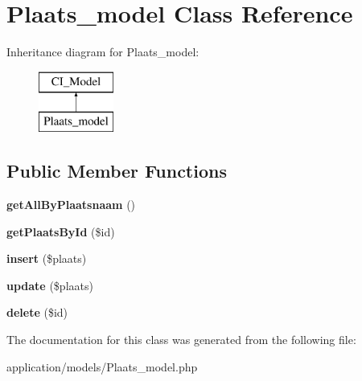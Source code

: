 \hypertarget{class_plaats__model}{}\section{Plaats\+\_\+model Class Reference}
\label{class_plaats__model}
Inheritance diagram for Plaats\+\_\+model\+:\begin{figure}[H]
\begin{center}
\leavevmode
\includegraphics[height=2.000000cm]{class_plaats__model}
\end{center}
\end{figure}
\subsection*{Public Member Functions}
\begin{DoxyCompactItemize}
\item 
\mbox{\label{class_plaats__model_a39dfb5046fda394e79bc2b17c0d8bd1f}} 
{\bfseries get\+All\+By\+Plaatsnaam} ()
\item 
\mbox{\label{class_plaats__model_ad74fde1e8efdd97f181c649e8d869590}} 
{\bfseries get\+Plaats\+By\+Id} (\$id)
\item 
\mbox{\label{class_plaats__model_a708c9f18b63ac2655c6121e63b5ffe7f}} 
{\bfseries insert} (\$plaats)
\item 
\mbox{\label{class_plaats__model_ac03a8dd14ad6cf143baca5f054ab94a1}} 
{\bfseries update} (\$plaats)
\item 
\mbox{\label{class_plaats__model_aed60da9232b9f683e0d9d62897e43cd7}} 
{\bfseries delete} (\$id)
\end{DoxyCompactItemize}


The documentation for this class was generated from the following file\+:\begin{DoxyCompactItemize}
\item 
application/models/Plaats\+\_\+model.\+php\end{DoxyCompactItemize}
